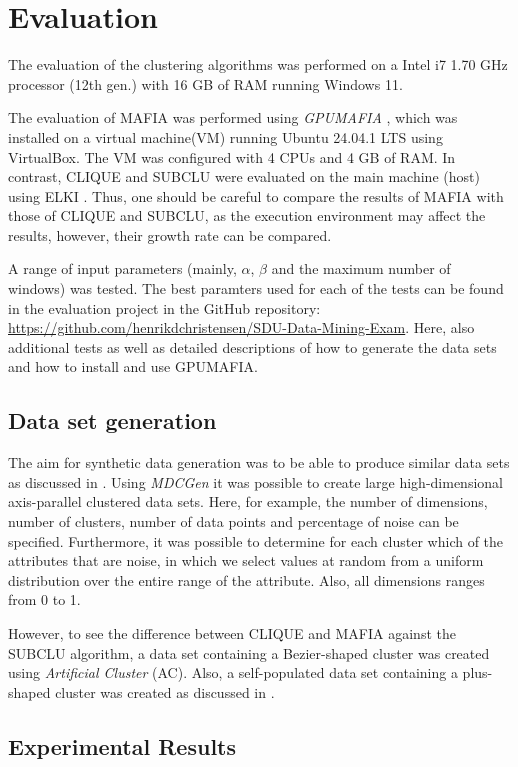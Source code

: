 \section{Evaluation}
The evaluation of the clustering algorithms was performed on a Intel i7 1.70 GHz processor (12th gen.) with 16 GB of RAM running Windows 11.

The evaluation of MAFIA was performed using \textit{GPUMAFIA} \cite{gpumafia}, which was installed on a virtual machine(VM) running Ubuntu 24.04.1 LTS using VirtualBox. The VM was configured with 4 CPUs and 4 GB of RAM. In contrast, CLIQUE and SUBCLU were evaluated on the main machine (host) using ELKI \cite{elki}. Thus, one should be careful to compare the results of MAFIA with those of CLIQUE and SUBCLU, as the execution environment may affect the results, however, their growth rate can be compared.

A range of input parameters (mainly, $\alpha$, $\beta$ and the maximum number of windows) was tested. The best paramters used for each of the tests can be found in the evaluation project in the GitHub repository: \url{https://github.com/henrikdchristensen/SDU-Data-Mining-Exam}. Here, also additional tests as well as detailed descriptions of how to generate the data sets and how to install and use GPUMAFIA.

\subsection{Data set generation}
The aim for synthetic data generation was to be able to produce similar data sets as discussed in \cite{mafia}. Using \textit{MDCGen} it was possible to create large high-dimensional axis-parallel clustered data sets. Here, for example, the number of dimensions, number of clusters, number of data points and percentage of noise can be specified. Furthermore, it was possible to determine for each cluster which of the attributes that are noise, in which we select values at random from a uniform distribution over the entire range of the attribute. Also, all dimensions ranges from 0 to 1.

However, to see the difference between CLIQUE and MAFIA against the SUBCLU algorithm, a data set containing a Bezier-shaped cluster was created using \textit{Artificial Cluster} (AC). Also, a self-populated data set containing a plus-shaped cluster was created as discussed in \cite{mafia}.

\subsection{Experimental Results}

